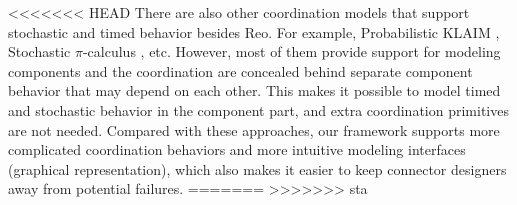 

\vspace{0.2cm}

<<<<<<< HEAD
    There are also other coordination models that support stochastic and timed behavior besides Reo. For example, Probabilistic KLAIM \cite{Pierro2004}, Stochastic $\pi$-calculus \cite{Priami95}, etc. However, most of them provide support for modeling components and the coordination are concealed behind separate component behavior that may depend on each other. This makes it possible to model timed and stochastic behavior in the component part, and extra coordination primitives are not needed. Compared with these approaches, our framework supports more complicated coordination behaviors and more intuitive modeling interfaces (graphical representation), which also makes it easier to keep connector designers away from potential failures.
=======
>>>>>>> sta

